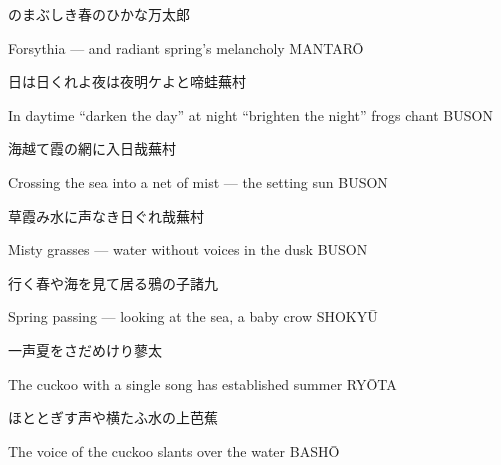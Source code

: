 \begin{haiku}
    {\FH {}のまぶしき春のひかな}\hfill{\FH 万太郎}

    \vin{} Forsythia ---
    \vin{} \vin{} and radiant spring's
    \vin{} \vin{} \vin{} melancholy \hspace{\fill} MANTAR\={O}
\end{haiku}

\begin{haiku}
    {\FH 日は日くれよ夜は夜明ケよと啼蛙}\hfill{\FH 蕪村}

    \vin{} In daytime ``darken the day''
    \vin{} \vin{} at night ``brighten the night''
    \vin{} \vin{} \vin{} frogs chant \hspace{\fill} BUSON
\end{haiku}

\begin{haiku}
    {\FH 海越て霞の網に入日哉}\hfill{\FH 蕪村}

    \vin{} Crossing the sea
    \vin{} \vin{} into a net of mist ---
    \vin{} \vin{} \vin{} the setting sun \hspace{\fill} BUSON
\end{haiku}

\begin{haiku}
    {\FH 草霞み水に声なき日ぐれ哉}\hfill{\FH 蕪村}

    \vin{} Misty grasses ---
    \vin{} \vin{} water without voices
    \vin{} \vin{} \vin{} in the dusk \hspace{\fill} BUSON
\end{haiku}

\begin{haiku}
    {\FH 行く春や海を見て居る鴉の子}\hfill{\FH 諸九}

    \vin{} Spring passing ---
    \vin{} \vin{} looking at the sea,
    \vin{} \vin{} \vin{} a baby crow \hspace{\fill} SHOKY\={U}
\end{haiku}

\begin{haiku}
    {\FH {}一声夏をさだめけり}\hfill{\FH 蓼太}

    \vin{} The cuckoo
    \vin{} \vin{} with a single song
    \vin{} \vin{} \vin{} has established summer \hspace{\fill} RY\={O}TA
\end{haiku}

\begin{haiku}
    {\FH ほととぎす声や横たふ水の上}\hfill{\FH 芭蕉}

    \vin{} The voice of the cuckoo
    \vin{} \vin{} slants
    \vin{} \vin{} \vin{} over the water \hspace{\fill} BASH\={O}
\end{haiku}

